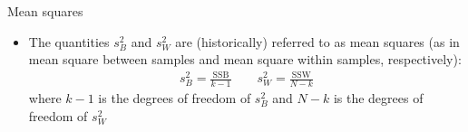 \documentclass[xcolor=dvipsnames]{beamer}
\begin{document}
\begin{frame}{Mean squares}
	\begin{itemize}
		\item The quantities $s^2_B$ and $s^2_W$ are (historically) referred to as mean squares (as in mean square between samples and mean square within samples, respectively):
		\begin{gather*}
			s^2_B = \frac{\text{SSB}}{k-1} \quad \quad s^2_W = \frac{\text{SSW}}{N-k}
		\end{gather*}
		where $k-1$ is the degrees of freedom of $s^2_B$ and $N-k$ is the degrees of freedom of $s^2_W$
	\end{itemize}
\end{frame}
\end{document}
